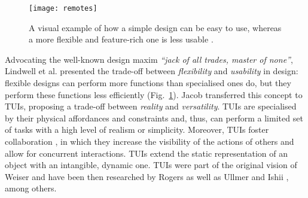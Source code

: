 \begin{figure}[hbt]
    \centering 
	\texttt{[image: remotes]}
	\caption{A visual example of how a simple design can be easy to use, whereas a more flexible and feature-rich one is less usable \autocite[p. 103]{lidwell_universal_2010}.}
	\label{fig:remotes}
\end{figure}

Advocating the well-known design maxim \textit{\enquote{jack of all trades, master of none}}, Lindwell et al. \autocite*[p. 102]{lidwell_universal_2010} presented the trade-off between \textit{flexibility} and \textit{usability} in design: flexible designs can perform more functions than specialised ones do, but they perform these functions less efficiently (Fig.~\ref{fig:remotes}). Jacob \autocite*{jacob_reality-based_2008} transferred this concept to TUIs, proposing a trade-off between \textit{reality} and \textit{versatility}. TUIs are specialised by their physical affordances and constraints and, thus, can perform a limited set of tasks with a high level of realism or simplicity. Moreover, TUIs foster collaboration \autocite{rogers_configuring_2003}, in which they increase the visibility of the actions of others and allow for concurrent interactions. TUIs extend the static representation of an object with an intangible, dynamic one. TUIs were part of the original vision of Weiser and have been then researched by Rogers as well as Ullmer and Ishii \autocite*{ullmer_emerging_2000}, among others.


